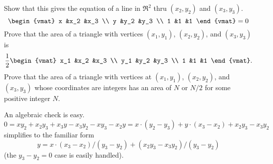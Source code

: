 \begin{exercises}
  \recommended \item
    \begin{exparts}
      \partsitem Show that this gives 
        the equation of a line in \( \Re^2 \) thru
        \( (x_2,y_2) \) and \( (x_3,y_3) \).
        \begin{equation*}
          \begin{vmat}
            x    &x_2 &x_3  \\
            y    &y_2 &y_3  \\
            1    &1   &1
          \end{vmat}=0
        \end{equation*}
      \partsitem \cite{Monthly55p249}
        Prove that the area of a triangle with vertices \( (x_1,y_1) \),
        \( (x_2,y_2) \), and \( (x_3,y_3) \) is
        \begin{equation*}
          \frac{1}{2}
          \begin{vmat}
            x_1  &x_2 &x_3  \\
            y_1  &y_2 &y_3  \\
            1    &1   &1
          \end{vmat}.
        \end{equation*}
      \partsitem \cite{MathMag73p286}
        Prove that the area of a triangle with vertices at \( (x_1,y_1) \),
        \( (x_2,y_2) \), and \( (x_3,y_3) \) whose coordinates are integers
        has an area of \( N \) or \( N/2 \) for some positive integer \( N \).
    \end{exparts}
    \begin{answer}
      \begin{exparts}
        \partsitem An algebraic check is easy.
        \begin{equation*}
          0
          =xy_2+x_2y_3+x_3y-x_3y_2-xy_3-x_2y 
          =x\cdot (y_2-y_3)+y\cdot (x_3-x_2)+x_2y_3-x_3y_2 
        \end{equation*}
        simplifies to the familiar form
        \begin{equation*}
          y=x\cdot (x_3-x_2)/(y_3-y_2)+(x_2y_3-x_3y_2)/(y_3-y_2)
        \end{equation*}
        (the $y_3-y_2=0$ case is easily handled).


\end{exparts}
\end{answer}
\end{exercises}
